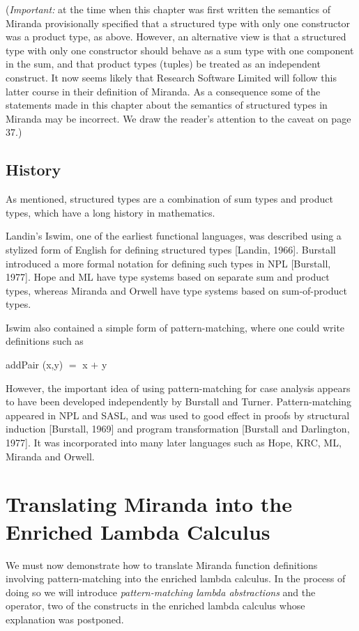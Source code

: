 (\textit{Important:} at the time when this chapter was first written the semantics of Miranda provisionally specified that a structured type with only one constructor was a product type, as above. However, an alternative view is that a structured type with only one constructor should behave as a sum type with one component in the sum, and that product types (tuples) be treated as an independent construct. It now seems likely that Research Software Limited will follow this latter course in their definition of Miranda. As a consequence some of the statements made in this chapter about the semantics of structured types in Miranda may be incorrect. We draw the reader's attention to the caveat on page 37.)

\subsection{History}

As mentioned, structured types are a combination of sum types and product types, which have a long history in mathematics.

Landin's Iswim, one of the earliest functional languages, was described using a stylized form of English for defining structured types [Landin, 1966]. Burstall introduced a more formal notation for defining such types in NPL [Burstall, 1977]. Hope and ML have type systems based on separate sum and product types, whereas Miranda and Orwell have type systems based on sum-of-product types.

Iswim also contained a simple form of pattern-matching, where one could write definitions such as
\begin{mlcoded}
    addPair (x,y) $=$ x $+$ y
\end{mlcoded}
However, the important idea of using pattern-matching for case analysis appears to have been developed independently by Burstall and Turner. Pattern-matching appeared in NPL and SASL, and was used to good effect in proofs by structural induction [Burstall, 1969] and program transformation
[Burstall and Darlington, 1977]. It was incorporated into many later
languages such as Hope, KRC, ML, Miranda and Orwell.

\section{Translating Miranda into the Enriched Lambda Calculus}

We must now demonstrate how to translate Miranda function definitions involving pattern-matching into the enriched lambda calculus. In the process of doing so we will introduce \textit{pattern-matching lambda abstractions} and the \fatbar{} operator, two of the constructs in the enriched lambda calculus whose explanation was postponed.

